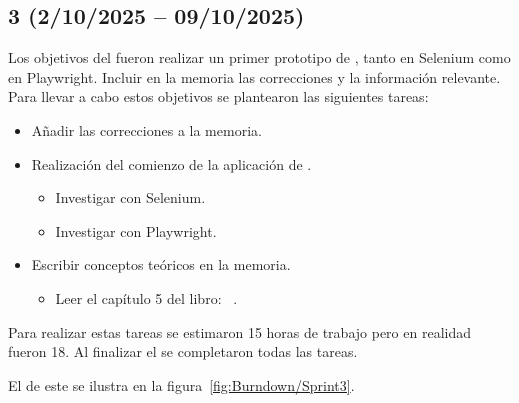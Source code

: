 \subsection{ 3 (2/10/2025 -- 09/10/2025)}
Los objetivos del  fueron realizar un primer prototipo de , tanto en Selenium como en Playwright. Incluir en la memoria las correcciones y la información relevante.
Para llevar a cabo estos objetivos se plantearon las siguientes tareas:
\begin{itemize}
\tightlist
	\item Añadir las correcciones a la memoria.
	\item Realización del comienzo de la aplicación de .
	\begin{itemize}
	\tightlist
		\item Investigar  con Selenium.
		\item Investigar  con Playwright.
	\end{itemize}
	\item Escribir conceptos teóricos en la memoria.
	\begin{itemize}
	\tightlist
		\item Leer el capítulo 5 del libro: ~\cite{book:RAG_SimpleGuide}.
	\end{itemize}
\end{itemize}

Para realizar estas tareas se estimaron 15 horas de trabajo pero en realidad fueron 18. Al finalizar el  se completaron todas las tareas.

El  de este  se ilustra en la figura~\ref{fig:Burndown/Sprint3}.

